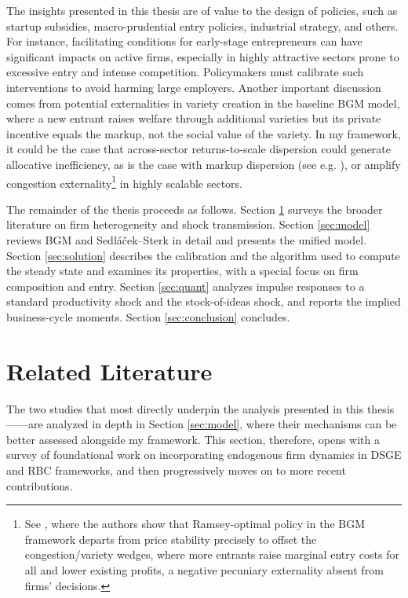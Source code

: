 \documentclass[a4paper,12pt]{article} %
\numberwithin{equation}{section} %
\numberwithin{figure}{section}
\numberwithin{table}{section}
\begin{document}
The insights presented in this thesis are of value to the design of policies, such as startup subsidies, macro-prudential entry policies, industrial strategy, and others.
For instance, facilitating conditions for early-stage entrepreneurs can have significant impacts on active firms, especially in highly attractive sectors prone to 
excessive entry and intense competition. Policymakers must calibrate such interventions to avoid harming large employers. Another important discussion
comes from potential externalities in variety creation in the baseline BGM 
model, where a new entrant raises welfare through additional varieties but its private incentive equals the markup, not the social value of the variety.
In my framework, it could be the case that across-sector returns-to-scale dispersion could generate allocative inefficiency, 
as is the case with markup dispersion (see e.g. \cite{baqaee2020productivity}), or amplify congestion 
externality\footnote{ See \textcite{bilbiie2014optimal}, where the authors show that Ramsey-optimal policy in the BGM framework departs from
price stability precisely to offset the congestion/variety wedges, where more entrants raise marginal entry costs for all and lower existing profits, a 
negative pecuniary externality absent from firms' decisions.} in highly scalable sectors. 

The remainder of the thesis proceeds as follows. Section \ref{sec:literature} surveys the broader literature on firm heterogeneity and shock transmission. 
Section \ref{sec:model} reviews BGM and Sedláček–Sterk in detail and presents the unified model. Section \ref{sec:solution} describes the calibration and the 
algorithm used to compute the steady state and examines its properties, with a special focus on firm composition and entry. Section \ref{sec:quant} analyzes 
impulse responses to a standard productivity shock and the stock-of-ideas shock, and reports the implied business-cycle moments. 
Section \ref{sec:conclusion} concludes.


\section{Related Literature}
\label{sec:literature}



The two studies that most directly underpin the analysis presented in this thesis —\textcite{bilbiie2012endogenous,sedlavcek2017growth}—are 
analyzed in depth in Section \ref{sec:model}, where their mechanisms can be better assessed alongside my framework. This section, therefore, opens 
with a survey of foundational work on incorporating endogenous firm dynamics in DSGE and RBC frameworks, and then progressively moves on to 
more recent contributions. 
\end{document}
